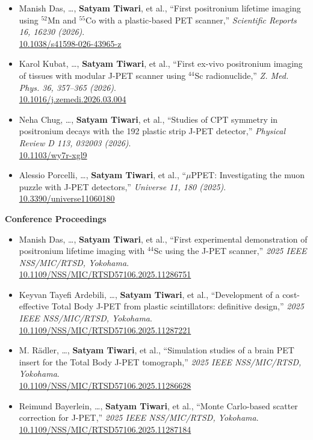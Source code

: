 \begin{itemize}
\href{https://doi.org/10.1109/TRPMS.2025.3621554}{10.1109/TRPMS.2025.3621554}
\item Manish Das, \ldots, \textbf{Satyam Tiwari}, et al., ``First positronium lifetime imaging using $^{52}$Mn and $^{55}$Co with a plastic-based PET scanner,'' \emph{Scientific Reports 16, 16230 (2026)}.\\
\href{https://doi.org/10.1038/s41598-026-43965-z}{10.1038/s41598-026-43965-z}
\item Karol Kubat, \ldots, \textbf{Satyam Tiwari}, et al., ``First ex-vivo positronium imaging of tissues with modular J-PET scanner using $^{44}$Sc radionuclide,'' \emph{Z. Med. Phys. 36, 357--365 (2026)}.\\
\href{https://doi.org/10.1016/j.zemedi.2026.03.004}{10.1016/j.zemedi.2026.03.004}
\item Neha Chug, \ldots, \textbf{Satyam Tiwari}, et al., ``Studies of CPT symmetry in positronium decays with the 192 plastic strip J-PET detector,'' \emph{Physical Review D 113, 032003 (2026)}.\\
\href{https://doi.org/10.1103/wy7r-xgl9}{10.1103/wy7r-xgl9}
\item Alessio Porcelli, \ldots, \textbf{Satyam Tiwari}, et al., ``$\mu$PPET: Investigating the muon puzzle with J-PET detectors,'' \emph{Universe 11, 180 (2025)}.\\
\href{https://doi.org/10.3390/universe11060180}{10.3390/universe11060180}
\end{itemize}

\textcolor{accentblue}{\textbf{Conference Proceedings}}
\begin{itemize}
\item Manish Das, \ldots, \textbf{Satyam Tiwari}, et al., ``First experimental demonstration of positronium lifetime imaging with $^{44}$Sc using the J-PET scanner,'' \emph{2025 IEEE NSS/MIC/RTSD, Yokohama}.\\
\href{https://doi.org/10.1109/NSS/MIC/RTSD57106.2025.11286751}{10.1109/NSS/MIC/RTSD57106.2025.11286751}
\item Keyvan Tayefi Ardebili, \ldots, \textbf{Satyam Tiwari}, et al., ``Development of a cost-effective Total Body J-PET from plastic scintillators: definitive design,'' \emph{2025 IEEE NSS/MIC/RTSD, Yokohama}.\\
\href{https://doi.org/10.1109/NSS/MIC/RTSD57106.2025.11287221}{10.1109/NSS/MIC/RTSD57106.2025.11287221}
\item M. R{\"a}dler, \ldots, \textbf{Satyam Tiwari}, et al., ``Simulation studies of a brain PET insert for the Total Body J-PET tomograph,'' \emph{2025 IEEE NSS/MIC/RTSD, Yokohama}.\\
\href{https://doi.org/10.1109/NSS/MIC/RTSD57106.2025.11286628}{10.1109/NSS/MIC/RTSD57106.2025.11286628}
\item Reimund Bayerlein, \ldots, \textbf{Satyam Tiwari}, et al., ``Monte Carlo-based scatter correction for J-PET,'' \emph{2025 IEEE NSS/MIC/RTSD, Yokohama}.\\
\href{https://doi.org/10.1109/NSS/MIC/RTSD57106.2025.11287184}{10.1109/NSS/MIC/RTSD57106.2025.11287184}
\end{itemize}

